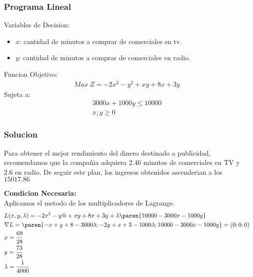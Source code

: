 \begin{homeworkProblem}[-1][Publicidad]

\subsubsection{Programa Lineal}
Variables de Decision:
\begin{itemize}
    \item $x$: cantidad de minutos a comprar de comerciales en tv.
    \item $y$: cantidad de minutos a comprar de comerciales en radio.
\end{itemize}
Funcion Objetivo:
\begin{align*}
    Max\ Z = -2x^2-y^2+xy+8x+3y
\end{align*}
Sujeta a:
\begin{align*}
    3000x+1000y\leq 10000 \\ x,y\geq0
\end{align*}
\subsubsection{Solucion}
Para obtener el mejor rendimiento del dinero destinado a publicidad, recomendamos que la compañia adquiera $2.46$ minutos de comerciales en TV y $2.6$ en radio. De seguir este plan, los ingresos obtenidos ascenderian a los $15017.86$

\textbf{Condicion Necesaria:}\\
Aplicamos el metodo de los multiplicadores de Lagrange.
\begin{align*}
    &L(x,y,\lambda)=-2x^2-y@+xy+8x+3y+\lambda\paren{10000-3000x-1000y}\\
    &\nabla L = \paren{-x+y+8-3000\lambda;-2y+x+3-1000\lambda ;10000 - 3000x-1000y} = (0;0;0)\\
    &x = \frac{69}{28} \\
    &y = \frac{73}{28} \\
    &\lambda = \frac{1}{4000}
\end{align*}



\end{homeworkProblem}
